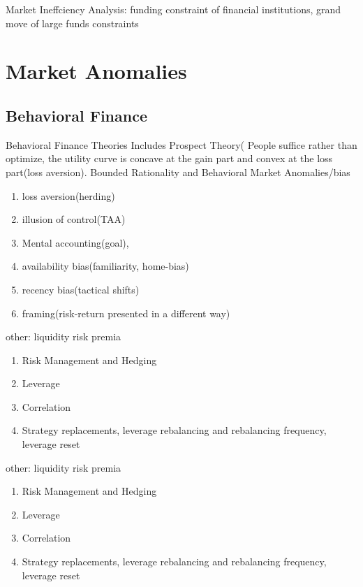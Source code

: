 \documentclass[11pt, openany]{book}              %
\begin{document}
Market Ineffciency Analysis: funding constraint of financial institutions, grand move of large funds constraints

\section{Market Anomalies}

\subsection{Behavioral Finance}

Behavioral Finance Theories Includes Prospect Theory( People suffice rather than optimize, the utility curve is concave at the gain part and convex at the loss part(loss aversion). Bounded Rationality and 
Behavioral Market Anomalies/bias

\begin{enumerate}
 \item loss aversion(herding)
 \item illusion of control(TAA) 
 \item Mental accounting(goal),
 \item availability bias(familiarity, home-bias)
 \item recency bias(tactical shifts)
 \item framing(risk-return presented in a different way)
\end{enumerate}




other: liquidity risk premia
\begin{enumerate}
 \item Risk Management and Hedging 
 \item Leverage 
 \item Correlation
 \item Strategy replacements, leverage rebalancing and rebalancing frequency, leverage reset
\end{enumerate}


other: liquidity risk premia
\begin{enumerate}
 \item Risk Management and Hedging 
 \item Leverage 
 \item Correlation
 \item Strategy replacements, leverage rebalancing and rebalancing frequency, leverage reset
\end{enumerate}
\end{document}
